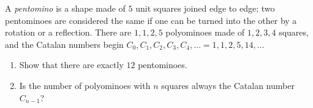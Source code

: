 A \emph{pentomino} is a shape made of $5$ unit squares joined edge to edge; two pentominoes are considered the same if one can be turned into the other by a rotation or a reflection. There are $1,1,2,5$ polyominoes made of $1,2,3,4$ squares, and the Catalan numbers begin $C_0,C_1,C_2,C_3,C_4,\dots=1,1,2,5,14,\dots$
\begin{enumerate}
\item[(a)] Show that there are exactly $12$ pentominoes.
\item[(b)] Is the number of polyominoes with $n$ squares always the Catalan number $C_{n-1}$?
\end{enumerate}
